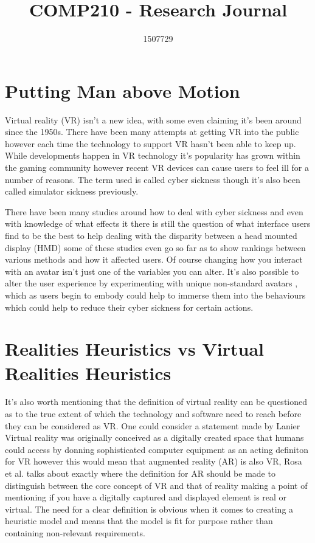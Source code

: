 \documentclass{scrartcl}
\title{COMP210 - Research Journal}
\author{1507729}
\begin{document}
\maketitle

\section{Putting Man above Motion}

Virtual reality (VR) isn't a new idea, with some even claiming it's been around since the 1950s. \cite{vrs2017origin} There have been many attempts at getting VR into the public however each time the technology to support VR hasn't been able to keep up. While developments happen in VR technology it's popularity has grown within the gaming community however recent VR devices can cause users to feel ill for a number of reasons. \cite{porcino2017minimizing} The term used is called cyber sickness though it's also been called simulator sickness \cite{gower1989simulator} previously.

There have been many studies around how to deal with cyber sickness and even with knowledge of what effects it there is still the question of what interface users find to be the best to help dealing with the disparity between a head mounted display (HMD) some of these studies even go so far as to show rankings between various methods and how it affected users. \cite{benzeroual2013cyber, mentzelopoulos2015hardware} Of course changing how you interact with an avatar isn't just one of the variables you can alter. It's also possible to alter the user experience by experimenting with unique non-standard avatars \cite{won2015homuncular}, which as users begin to embody could help to immerse them into the behaviours which could help to reduce their cyber sickness for certain actions. 

\section{Realities Heuristics vs Virtual Realities Heuristics}

It's also worth mentioning that the definition of virtual reality can be questioned as to the true extent of which the technology and software need to reach before they can be considered as VR. One could consider a statement made by Lanier \cite{lanier1992virtual} Virtual reality was originally conceived as a digitally created space that humans could access by donning sophisticated computer equipment as an acting definiton for VR however this would mean that augmented reality (AR) is also VR,  Rosa et al. talks about exactly where the definition for AR should be made to distinguish between the core concept of VR and that of reality making a point of mentioning if you have a digitally captured and displayed element is real or virtual. \cite{rosa2016re} The need for a clear definition is obvious when it comes to creating a heuristic model and means that the model is fit for purpose rather than containing non-relevant requirements.
\end{document}
